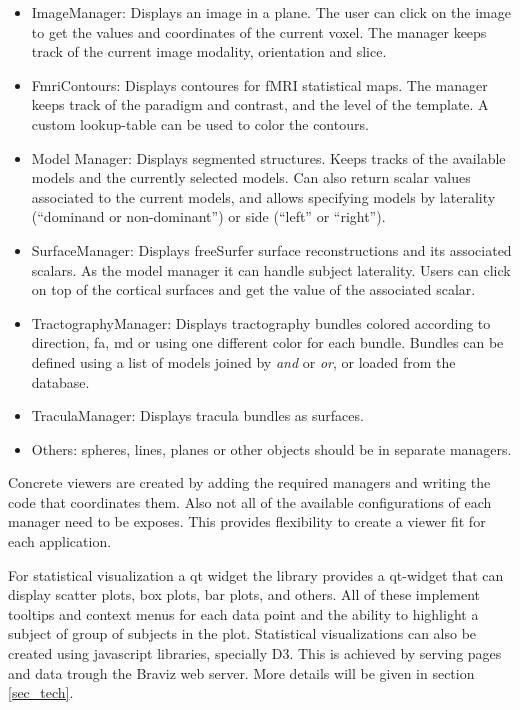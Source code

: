 \begin{itemize}
	\item ImageManager: Displays an image in a plane. The user can click on the image to get the values and coordinates of the current voxel. The manager keeps track of the current image modality, orientation and slice.
	\item FmriContours: Displays contoures for fMRI statistical maps. The manager keeps track of the paradigm and contrast, and the level of the template. A custom lookup-table can be used to color the contours.
	\item Model Manager: Displays segmented structures. Keeps tracks of the available models and the currently selected models. Can also return scalar values associated to the current models, and allows specifying models by laterality ("`dominand or non-dominant"') or side ("`left"' or "`right"').
	\item SurfaceManager: Displays freeSurfer surface reconstructions and its associated scalars. As the model manager it can handle subject laterality. Users can click on top of the cortical surfaces and get the value of the associated scalar. 
	\item TractographyManager: Displays tractography bundles colored according to direction, fa, md or using one different color for each bundle. Bundles can be defined using a list of models joined by \emph{and} or \emph{or}, or loaded from the database. 
	\item TraculaManager: Displays tracula bundles as surfaces.	
	\item Others: spheres, lines, planes or other objects should be in separate managers.
\end{itemize}

Concrete viewers are created by adding the required managers and writing the code that coordinates them. Also not all of the available configurations of each manager need to be exposes. This provides flexibility to create a viewer fit for each application.


For statistical visualization a qt widget the library provides a qt-widget that can display scatter plots, box plots, bar plots, and others. All of these implement tooltips and context menus for each data point and the ability to highlight a subject of group of subjects in the plot. Statistical visualizations can also be created using javascript libraries, specially D3. This is achieved by serving pages and data trough the Braviz web server. More details will be given in section \ref{sec_tech}.

